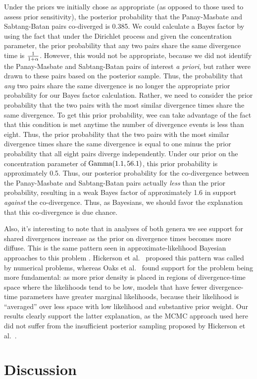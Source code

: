 Under the priors we initially chose as appropriate (as opposed to those used to
assess prior sensitivity), the posterior probability that the Panay-Masbate and
Sabtang-Batan pairs co-diverged is 0.385.
We could calculate a Bayes factor by using the fact that under the Dirichlet
process and given the concentration parameter, the prior probability that any
two pairs share the same divergence time is $\frac{1}{1 + \alpha}$.
However, this would not be appropriate, because we did not identify
the Panay-Masbate and
Sabtang-Batan pairs of interest
\emph{a priori}, but rather were drawn to these pairs based
on the posterior sample.
Thus, the probability that \emph{any} two pairs share the same divergence
is no longer the appropriate prior probability for our Bayes factor calculation.
Rather, we need to consider the prior probability that the two pairs with
the most similar divergence times share the same divergence.
To get this prior probability, wee can take advantage of the fact that this
condition is met anytime the number of divergence events is less than eight.
Thus, the prior probability that the two pairs with the most similar divergence
times share the same divergence is equal to one minus the prior probability
that all eight pairs diverge independently.
Under our prior on the concentration parameter of $\textrm{Gamma}(1.1, 56.1)$,
this prior probability is approximately 0.5.
Thus, our posterior probability for the co-divergence between the Panay-Masbate
and Sabtang-Batan pairs actually \emph{less} than the prior probability,
resulting in a weak Bayes factor of approximately 1.6 in support \emph{against}
the co-divergence.
Thus, as Bayesians, we should favor the explanation that this co-divergence is
due chance.

Also, it's interesting to note that in analyses of both genera we see
support for shared divergences increase as the prior on divergence times
becomes more diffuse.
This is the same pattern seen in approximate-likelihood Bayesian approaches to
this problem \citep{Oaks2012,Hickerson2013,Oaks2014reply}.
Hickerson et al.\ \citeyear{Hickerson2013} proposed this pattern was
called by numerical problems, whereas Oaks et al.\ \citeyear{Oaks2014reply}
found support for the problem being more fundamental:
as more prior density is placed in regions of divergence-time space where the
likelihoods tend to be low, models that have fewer divergence-time parameters
have greater marginal likelihoods, because their likelihood is ``averaged''
over less space with low likelihood and substantive prior weight.
Our results clearly support the latter explanation, as the
MCMC approach used here did not suffer from the insufficient posterior sampling
proposed by Hickerson et al.\ \citeyear{Hickerson2013}.

\section{Discussion}
